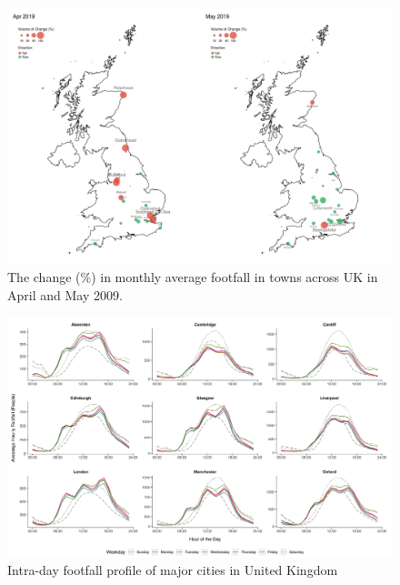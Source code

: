 \begin{figure}
  \forcerectofloat
  \includegraphics[trim={0 12 0 0},clip]{images/applications-city-indices.png}
  \caption{The change (\%) in monthly average footfall in towns across UK in April and May 2009.}
  \label{figure:applications:cities:month}
\end{figure}

\begin{figure}
  \forcerectofloat
  \includegraphics[trim={0 10 0 0},clip]{images/applications-city-profiles.png}
  \caption{Intra-day footfall profile of major cities in United Kingdom}
  \label{figure:applications:cities:profiles}
\end{figure}

